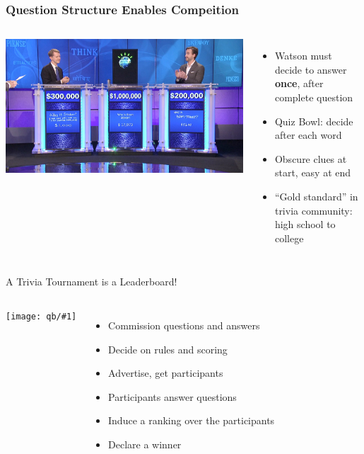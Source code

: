 \documentclass[xcolor=dvipsnames,xcolor=table]{beamer}
\newcommand{\gfxq}[2]{
\begin{center}
	\texttt{[image: qb/\#1]}
\end{center}
}
\begin{document}
\begin{frame}
	\frametitle{Question Structure Enables Compeition}

	\begin{columns}

		\includegraphics[width=1.0\linewidth]{qb/jeopardy}


		\begin{itemize}
                        \item Watson must decide to answer {\bf once}, after
                          complete question
                        \item Quiz Bowl: decide after each word
                        \item Obscure clues at start, easy at end
                        \item ``Gold standard'' in trivia community: high school to college
		\end{itemize}

	\end{columns}

      \end{frame}

      \begin{frame}{A Trivia Tournament is a Leaderboard!}
        \begin{columns}
          \gfxq{trivia_tournament_leaderboard}{.8}

          \begin{itemize}
\item Commission questions and answers
\item Decide on rules and scoring
\item Advertise, get participants
\item Participants answer questions
\item Induce a ranking over the participants
\item Declare a winner
          \end{itemize}
        \end{columns}
      \end{frame}
\end{document}
